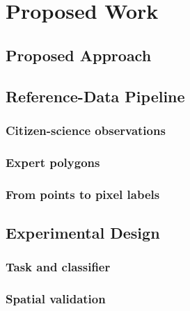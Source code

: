 \chapter{Proposed Work}
\label{sec:proposed-work}


\section{Proposed Approach}
\label{sec:proposed-work-approach}

\section{Reference-Data Pipeline}
\label{sec:proposed-work-pipeline}

\subsection{Citizen-science observations}
\label{sec:proposed-work-pipeline-cs}
\todo[inline]{}

\subsection{Expert polygons}
\label{sec:proposed-work-pipeline-expert}
\todo[inline]{}

\subsection{From points to pixel labels}
\label{sec:proposed-work-pipeline-labels}
\todo[inline]{}

\section{Experimental Design}
\label{sec:proposed-work-design}

\subsection{Task and classifier}
\label{sec:proposed-work-design-task}
\todo[inline]{}

\subsection{Spatial validation}
\label{sec:proposed-work-design-validation}
\todo[inline]{}

